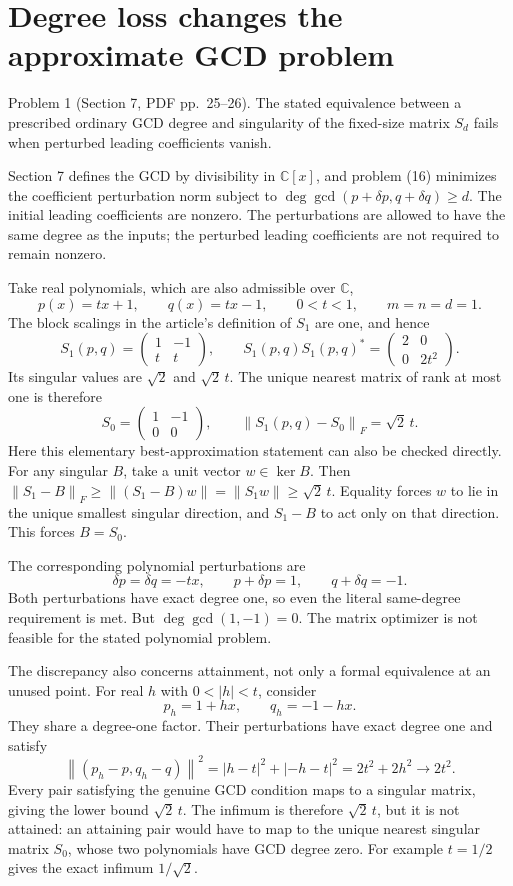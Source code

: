 \documentclass[10pt]{article}
\begin{document}
\section*{Degree loss changes the approximate GCD problem}
Problem 1 (Section 7, PDF pp. 25–26).  The stated equivalence between a prescribed ordinary GCD degree and singularity of the fixed-size matrix \(S_d\) fails when perturbed leading coefficients vanish.\par
Section 7 defines the GCD by divisibility in \(\mathbb C[x]\), and problem (16) minimizes the coefficient perturbation norm subject to \(\deg\gcd(p+\delta p,q+\delta q)\ge d\). The initial leading coefficients are nonzero. The perturbations are allowed to have the same degree as the inputs; the perturbed leading coefficients are not required to remain nonzero.\par
Take real polynomials, which are also admissible over \(\mathbb C\), \[p(x)=tx+1,\qquad q(x)=tx-1,\qquad 0<t<1,\qquad m=n=d=1.\] The block scalings in the article’s definition of \(S_1\) are one, and hence \[S_1(p,q)=
 \begin{pmatrix}1&-1\\t&t\end{pmatrix},\qquad
 S_1(p,q)S_1(p,q)^*=
 \begin{pmatrix}2&0\\0&2t^2\end{pmatrix}.\] Its singular values are \(\sqrt2\) and \(\sqrt2\,t\). The unique nearest matrix of rank at most one is therefore \[S_0=\begin{pmatrix}1&-1\\0&0\end{pmatrix},
 \qquad \left\lVert S_1(p,q)-S_0\right\rVert_F=\sqrt2\,t .\] Here this elementary best-approximation statement can also be checked directly. For any singular \(B\), take a unit vector \(w\in\ker B\). Then \(\left\lVert S_1-B\right\rVert_F\ge\left\lVert(S_1-B)w\right\rVert
=\left\lVert S_1w\right\rVert\ge\sqrt2\,t\). Equality forces \(w\) to lie in the unique smallest singular direction, and \(S_1-B\) to act only on that direction. This forces \(B=S_0\).\par
The corresponding polynomial perturbations are \[\delta p=\delta q=-tx,\qquad
 p+\delta p=1,\qquad q+\delta q=-1 .\] Both perturbations have exact degree one, so even the literal same-degree requirement is met. But \(\deg\gcd(1,-1)=0\). The matrix optimizer is not feasible for the stated polynomial problem.\par
The discrepancy also concerns attainment, not only a formal equivalence at an unused point. For real \(h\) with \(0<|h|<t\), consider \[p_h=1+hx,\qquad q_h=-1-hx .\] They share a degree-one factor. Their perturbations have exact degree one and satisfy \[\left\lVert(p_h-p,q_h-q)\right\rVert^2
 =|h-t|^2+|-h-t|^2=2t^2+2h^2\longrightarrow 2t^2 .\] Every pair satisfying the genuine GCD condition maps to a singular matrix, giving the lower bound \(\sqrt2\,t\). The infimum is therefore \(\sqrt2\,t\), but it is not attained: an attaining pair would have to map to the unique nearest singular matrix \(S_0\), whose two polynomials have GCD degree zero. For example \(t=1/2\) gives the exact infimum \(1/\sqrt2\).\par
\end{document}

